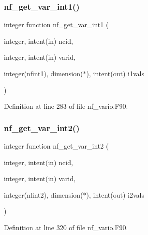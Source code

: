 \mbox{\label{nf__vario_8F90_a021297a633b5d3c578d9054f4249e4f4}} 
\subsubsection{\texorpdfstring{nf\+\_\+get\+\_\+var\+\_\+int1()}{nf\_get\_var\_int1()}}
{\footnotesize\ttfamily integer function nf\+\_\+get\+\_\+var\+\_\+int1 (\begin{DoxyParamCaption}\item[{integer, intent(in)}]{ncid,  }\item[{integer, intent(in)}]{varid,  }\item[{integer(nfint1), dimension($\ast$), intent(out)}]{i1vals }\end{DoxyParamCaption})}



Definition at line 283 of file nf\+\_\+vario.\+F90.

\mbox{\label{nf__vario_8F90_ad3103564244c9eddfc1615048642a2db}} 
\subsubsection{\texorpdfstring{nf\+\_\+get\+\_\+var\+\_\+int2()}{nf\_get\_var\_int2()}}
{\footnotesize\ttfamily integer function nf\+\_\+get\+\_\+var\+\_\+int2 (\begin{DoxyParamCaption}\item[{integer, intent(in)}]{ncid,  }\item[{integer, intent(in)}]{varid,  }\item[{integer(nfint2), dimension($\ast$), intent(out)}]{i2vals }\end{DoxyParamCaption})}



Definition at line 320 of file nf\+\_\+vario.\+F90.

\mbox{\label{nf__vario_8F90_a8cffe87483851c5d94582142c0911009}} 
